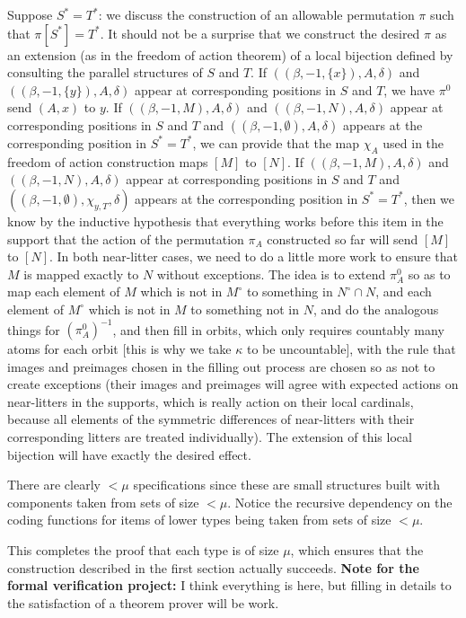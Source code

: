 Suppose $S^* = T^*$:  we discuss the construction of an allowable permutation $\pi$ such that $\pi[S^*]=T^*$.  It should not be a surprise
that we construct the desired $\pi$ as an extension (as in the freedom of action theorem) of a local bijection defined by consulting the parallel structures of $S$ and $T$.  If $((\beta,-1,\{x\}),A,\delta)$ and $((\beta,-1,\{y\}),A,\delta)$ appear at corresponding positions in $S$ and $T$, we have $\pi^0$ send
$(A,x)$ to $y$.  If $((\beta,-1,M),A,\delta)$ and $((\beta,-1,N),A,\delta)$ appear at corresponding positions in $S$ and $T$ and $((\beta,-1,\emptyset),A,\delta)$ appears at the corresponding position in $S^*=T^*$, we can provide that the map $\chi_A$ used in the freedom of action construction
maps $[M]$ to $[N]$.  If $((\beta,-1,M),A,\delta)$ and $((\beta,-1,N),A,\delta)$ appear at corresponding positions in $S$ and $T$ and $((\beta,-1,\emptyset),\chi_{y,T},\delta)$ appears at the corresponding position in $S^*=T^*$,  then we know by the inductive hypothesis that everything works before this item in the support that the action of the permutation $\pi_A$ constructed so far will send $[M]$ to $[N]$.  In both near-litter cases, we need to do a little more work to ensure that $M$ is mapped exactly to $N$ without exceptions.  The idea is to extend $\pi^0_A$ so as to map each element of
$M$ which is not in $M^\circ$ to something in $N^\circ \cap N$, and each element of $M^\circ$ which is not in $M$ to something not in $N$, and do the analogous things for $(\pi^0_A)^{-1}$, and then fill in orbits, which only requires countably many atoms for each orbit [this is why we take $\kappa$ to be uncountable], with the rule that images and preimages chosen in the filling out process are chosen so as not to create exceptions (their images and preimages will agree with expected actions on near-litters in the supports, which is really action on their local cardinals, because all elements of the symmetric differences of near-litters with their corresponding litters are treated individually).  The extension of this local bijection will have exactly the desired effect.

There are clearly $<\mu$ specifications since these are small structures built with components taken from sets of size $<\mu$.  Notice the recursive dependency on the coding functions for items of lower types being taken from sets of size $<\mu$.

This completes the proof that each type is of size $\mu$, which ensures that the construction described in the first section actually succeeds.
{\bf Note for the formal verification project:}  I think everything is here, but filling in details to the satisfaction of a theorem prover will be work.
\newpage

